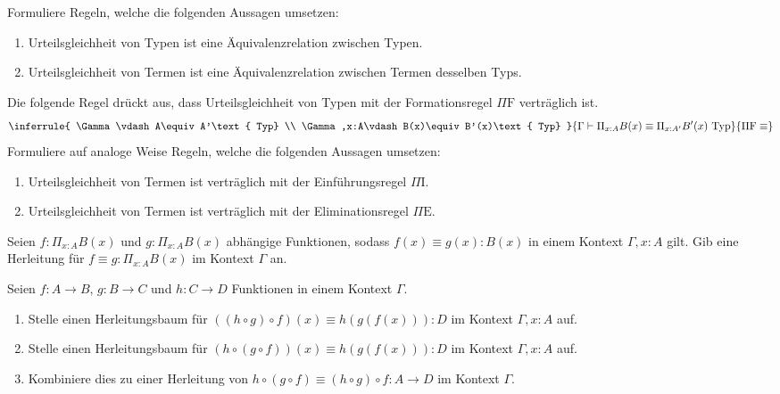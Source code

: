 \documentclass{uebung}
\begin{document}

\begin{exercise}
  Formuliere Regeln, welche die folgenden Aussagen umsetzen:
  \begin{enumerate}
    \item Urteilsgleichheit von Typen ist eine Äquivalenzrelation zwischen Typen.
    \item Urteilsgleichheit von Termen ist eine Äquivalenzrelation zwischen Termen desselben Typs.
  \end{enumerate}
  Die folgende Regel drückt aus, dass Urteilsgleichheit von Typen mit der Formationsregel $\Pi\mathrm{F}$ verträglich ist.
  $$
  \inferrule{
    \Gamma\vdash A\equiv A'\text{ Typ} \\ \Gamma,x:A\vdash B(x)\equiv B'(x)\text{ Typ}
  }{
    \Gamma\vdash \Pi_{x:A}B(x)\equiv\Pi_{x:A'}B'(x)\text{ Typ}
  }{
    \Pi\mathrm{F}\equiv
  }
  $$
  Formuliere auf analoge Weise Regeln, welche die folgenden Aussagen umsetzen:
  \begin{enumerate}[start=3]
    \item Urteilsgleichheit von Termen ist verträglich mit der Einführungsregel $\Pi\mathrm{I}$.
    \item Urteilsgleichheit von Termen ist verträglich mit der Eliminationsregel $\Pi\mathrm{E}$.
  \end{enumerate}
\end{exercise}

\begin{exercise}
  Seien $f:\Pi_{x:A}B(x)$ und $g:\Pi_{x:A}B(x)$ abhängige Funktionen, sodass $f(x)\equiv g(x):B(x)$ in einem Kontext $\Gamma,x:A$ gilt.
  Gib eine Herleitung für $f\equiv g:\Pi_{x:A}B(x)$ im Kontext $\Gamma$ an.
\end{exercise}

\begin{exercise}
  Seien $f:A\to B$, $g:B\to C$ und $h:C\to D$ Funktionen in einem Kontext $\Gamma$.
  \begin{enumerate}
    \item Stelle einen Herleitungsbaum für $((h\circ g)\circ f)(x)\equiv h(g(f(x))):D$ im Kontext $\Gamma,x:A$ auf.
    \item Stelle einen Herleitungsbaum für $(h\circ (g\circ f))(x)\equiv h(g(f(x))):D$ im Kontext $\Gamma,x:A$ auf.
    \item Kombiniere dies zu einer Herleitung von $h\circ(g\circ f)\equiv (h\circ g)\circ f:A\to D$ im Kontext $\Gamma$.
  \end{enumerate}
\end{exercise}
\end{document}
